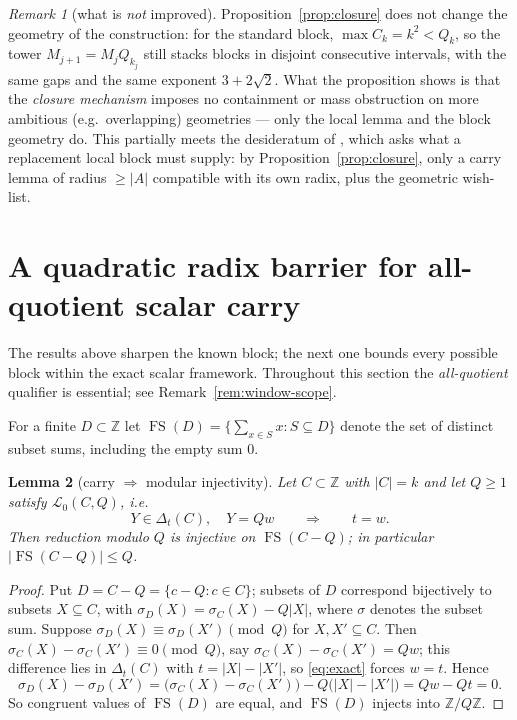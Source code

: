 \documentclass[11pt]{article}
\newtheorem{lemma}{Lemma}[section]
\theoremstyle{definition}
\theoremstyle{remark}
\newtheorem{remark}[lemma]{Remark}
\newcommand{\Z}{\mathbb{Z}}
\newcommand{\FS}{\operatorname{FS}}
\newcommand{\loc}[1]{\mathcal{L}_{#1}}
\begin{document}
\begin{remark}[what is \emph{not} improved]\label{rem:geometry}
Proposition~\ref{prop:closure} does not change the geometry of the
construction: for the standard block, $\max C_k=k^2<Q_k$, so the tower
$M_{j+1}=M_jQ_{k_j}$ still stacks blocks in disjoint consecutive
intervals, with the same gaps and the same exponent $3+2\sqrt2$. What the
proposition shows is that the \emph{closure mechanism} imposes no
containment or mass obstruction on more ambitious (e.g.\ overlapping)
geometries --- only the local lemma and the block geometry do. This
partially meets the desideratum of \cite[Remark~4]{Mazur26}, which asks
what a replacement local block must supply: by
Proposition~\ref{prop:closure}, only a carry lemma of radius
$\ge|A|$ compatible with its own radix, plus the geometric wish-list.
\end{remark}

\section{A quadratic radix barrier for all-quotient scalar
carry}\label{sec:wall}

The results above sharpen the known block; the next one bounds every
possible block within the exact scalar framework. Throughout this
section the \emph{all-quotient} qualifier is essential; see
Remark~\ref{rem:window-scope}.

For a finite $D\subset\Z$ let $\FS(D)=\{\sum_{x\in S}x:S\subseteq D\}$
denote the set of distinct subset sums, including the empty sum $0$.

\begin{lemma}[carry $\Rightarrow$ modular injectivity]\label{lem:inj}
Let $C\subset\Z$ with $|C|=k$ and let $Q\ge1$ satisfy $\loc0(C,Q)$, i.e.
\begin{equation}\label{eq:exact}
Y\in\Delta_t(C),\quad Y=Qw
\qquad\Longrightarrow\qquad t=w .
\end{equation}
Then reduction modulo $Q$ is injective on $\FS(C-Q)$; in particular
$|\FS(C-Q)|\le Q$.
\end{lemma}

\begin{proof}
Put $D=C-Q=\{c-Q:c\in C\}$; subsets of $D$ correspond bijectively to
subsets $X\subseteq C$, with $\sigma_D(X)=\sigma_C(X)-Q|X|$, where
$\sigma$ denotes the subset sum. Suppose
$\sigma_D(X)\equiv\sigma_D(X')\pmod Q$ for $X,X'\subseteq C$. Then
$\sigma_C(X)-\sigma_C(X')\equiv0\pmod Q$, say
$\sigma_C(X)-\sigma_C(X')=Qw$; this difference lies in $\Delta_t(C)$ with
$t=|X|-|X'|$, so \eqref{eq:exact} forces $w=t$. Hence
\[
\sigma_D(X)-\sigma_D(X')
=\bigl(\sigma_C(X)-\sigma_C(X')\bigr)-Q\bigl(|X|-|X'|\bigr)
=Qw-Qt=0 .
\]
So congruent values of $\FS(D)$ are equal, and $\FS(D)$ injects into
$\Z/Q\Z$.
\end{proof}
\end{document}
